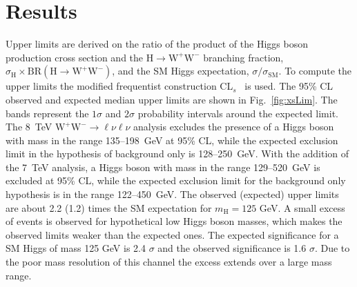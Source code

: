 \documentclass{PoS}
\newcommand{\Hi}{\ensuremath{\mathrm{H}}}
\newcommand{\W}{\ensuremath{\mathrm{W}}}
\newcommand{\WW}{\ensuremath{\W^+\W^-}}
\newcommand{\mHi}{\ensuremath{m_{\mathrm{H}}}}
\begin{document}
\section{Results}
\label{sec:results}
Upper limits are derived on the ratio of the product of the Higgs
boson production cross section and the $\Hi \to \WW$ branching
fraction, $\sigma_{\Hi} \times \mathrm{BR}(\Hi \to \WW)$, and the SM
Higgs expectation, $\sigma/\sigma_\mathrm{SM}$.  To compute the upper
limits the modified frequentist construction CL$_{s}$~\cite{Read} is
used.  The 95\% CL observed and expected median upper limits are shown
in Fig.~\ref{fig:xsLim}. The bands represent the $1 \sigma$ and $2
\sigma$ probability intervals around the expected limit.  The 8~TeV
$\WW \to \ell\nu\ell\nu$ analysis excludes the presence of a Higgs
boson with mass in the range 135--198~GeV at 95\% CL, while the
expected exclusion limit in the hypothesis of background only is
128--250~GeV. With the addition of the 7~TeV analysis, a Higgs boson
with mass in the range 129--520~GeV is excluded at 95\% CL, while the
expected exclusion limit for the background only hypothesis is in the
range 122--450~GeV.  The observed (expected) upper limits are about
2.2 (1.2) times the SM expectation for $\mHi=125$ GeV.  A small excess
of events is observed for hypothetical low Higgs boson masses, which
makes the observed limits weaker than the expected ones.  The expected
significance for a SM Higgs of mass 125 GeV is 2.4 $\sigma$ and the
observed significance is 1.6 $\sigma$.  Due to the poor mass
resolution of this channel the excess extends over a large mass range.
\end{document}
